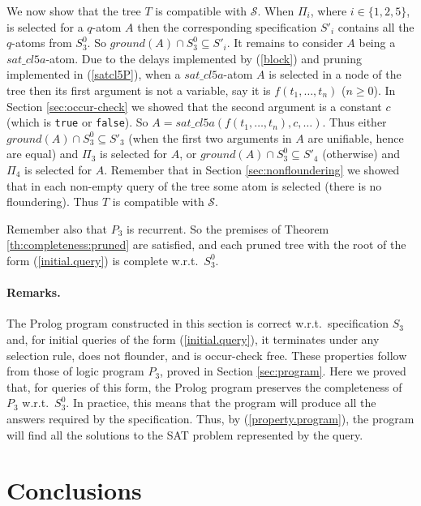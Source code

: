 \documentclass{tlp}
\newcommand*{\seq}[2][n]  {{#2_{1}, \allowbreak \ldots, \allowbreak #2_{#1}}}
\renewcommand*{\S}{{\ensuremath{\mathscr S}}\xspace}
\begin{document}
We now show that the tree $T$ is compatible with \S.
When  $\Pi_i$, where $i\in\{1,2,5\}$,  is selected for a $q$-atom $A$ then
the corresponding specification $S'_i$ contains all the $q$-atoms from $S_3^0$.
So $ground(A)\cap S_3^0\subseteq S'_i$.
It remains to consider $A$ being a $sat\_cl5a$-atom.
Due to the delays implemented by (\ref{block}) and 
pruning implemented in (\ref{satcl5P}), when a $sat\_cl5a$-atom $A$ is
selected in a node of the tree then its first argument is not a variable,
say it is $f(\seq t)$  ($n\geq0$).
In Section \ref{sec:occur-check} we showed that the second argument is a
constant $c$ (which is {\tt true} or {\tt false}).  
So $A = sat\_cl5a(f(\seq t),c,\ldots)$.
Thus either $ground(A) \cap S_3^0\subseteq S'_3$
(when the first two arguments in $A$ are unifiable, hence are equal)
and $\Pi_3$ is selected for $A$, or
$ground(A) \cap S_3^0\subseteq S'_4$ (otherwise)
and $\Pi_4$ is selected for $A$.
Remember that in Section \ref{sec:nonfloundering} we showed 
that in each non-empty query of the tree some atom is selected (there is no
floundering). 
Thus $T$ is compatible with  \S.





Remember also that $P_3$ is recurrent. 
So the premises of Theorem \ref{th:completeness:pruned}
are satisfied, and each pruned tree with the root of the form
(\ref{initial.query}) is complete w.r.t.\ $S_3^0$.


\paragraph{Remarks.}
The Prolog program constructed in this section
is correct w.r.t.\ specification $S_3$ and, for initial queries of the form 
(\ref{initial.query}), it terminates under any selection rule,
does not flounder, and is occur-check free.  These properties follow from
those of logic program $P_3$, proved in Section \ref{sec:program}.
Here we proved that, for queries of this form,
the Prolog program preserves the completeness 
of $P_3$ w.r.t.~$S_3^0$.
In practice, this means that the program will produce
all the answers required by the specification.
Thus, by (\ref{property.program}), the program will find all the solutions to
the SAT problem represented by the query.



\section{Conclusions}
\end{document}
